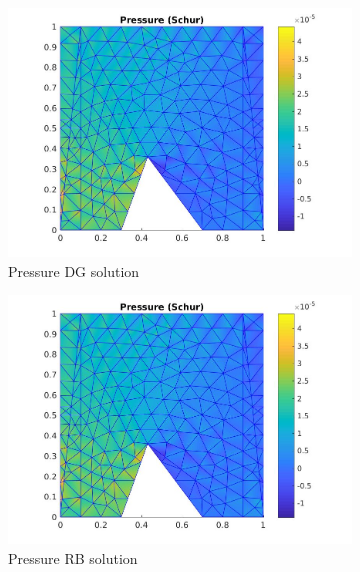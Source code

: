 \documentclass[graybox]{svmult}
\begin{document}
\begin{figure}
\begin{subfigure}{0.31\textwidth}
\includegraphics[width=\linewidth]{offline_pressure_at_43_36.jpg}
\caption{Pressure DG solution} \label{pre_dg}
\end{subfigure}\hspace*{\fill}
\begin{subfigure}{0.31\textwidth}
\includegraphics[width=\linewidth]{offline_pressure_at_43_36.jpg}
\caption{Pressure RB solution} \label{pre_rb}
\end{subfigure}
\begin{subfigure}{0.31\textwidth}

\end{subfigure}
\end{figure}
\end{document}
